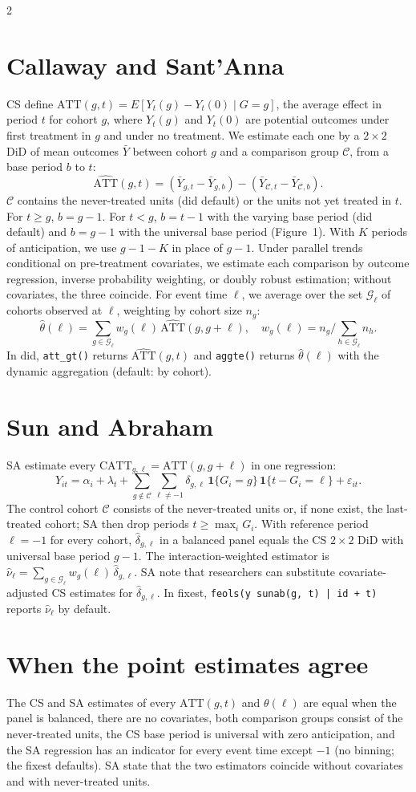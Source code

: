 \documentclass[10pt,letterpaper]{article}
\newcommand{\code}[1]{\texttt{#1}}
\newcommand{\ind}{\mathbf{1}}
\newcommand{\Cg}{\mathcal{C}}
\newcommand{\Gl}{\mathcal{G}_\ell}
\newcommand{\ATT}{\mathrm{ATT}}
\newcommand{\hATT}{\widehat{\mathrm{ATT}}}
\begin{document}
\begin{multicols}{2}
\section{Callaway and Sant'Anna}
CS define $\ATT(g,t)=E[Y_t(g)-Y_t(0)\mid G=g]$, the average effect in period $t$ for cohort $g$, where $Y_t(g)$ and $Y_t(0)$ are potential outcomes under first treatment in $g$ and under no treatment. We estimate each one by a $2{\times}2$ DiD of mean outcomes $\bar Y$ between cohort $g$ and a comparison group $\Cg$, from a base period $b$ to $t$:
\[
\hATT(g,t)=(\bar Y_{g,t}-\bar Y_{g,b})-(\bar Y_{\Cg,t}-\bar Y_{\Cg,b}).
\]
$\Cg$ contains the never-treated units (did default) or the units not yet treated in $t$. For $t\ge g$, $b=g-1$. For $t<g$, $b=t-1$ with the varying base period (did default) and $b=g-1$ with the universal base period (Figure~1). With $K$ periods of anticipation, we use $g-1-K$ in place of $g-1$. Under parallel trends conditional on pre-treatment covariates, we estimate each comparison by outcome regression, inverse probability weighting, or doubly robust estimation; without covariates, the three coincide. For event time $\ell$, we average over the set $\Gl$ of cohorts observed at $\ell$, weighting by cohort size $n_g$:
\[
\hat\theta(\ell)=\textstyle\sum_{g\in\Gl}w_g(\ell)\,\hATT(g,g+\ell),\quad w_g(\ell)=n_g\big/\textstyle\sum_{h\in\Gl}n_h.
\]
In did, \code{att\_gt()} returns $\hATT(g,t)$ and \code{aggte()} returns $\hat\theta(\ell)$ with the dynamic aggregation (default: by cohort).

\section{Sun and Abraham}
SA estimate every $\mathrm{CATT}_{g,\ell}=\ATT(g,g+\ell)$ in one regression:
\[
Y_{it}=\alpha_i+\lambda_t+\textstyle\sum_{g\notin\Cg}\sum_{\ell\neq-1}\delta_{g,\ell}\,\ind\{G_i=g\}\,\ind\{t-G_i=\ell\}+\varepsilon_{it}.
\]
The control cohort $\Cg$ consists of the never-treated units or, if none exist, the last-treated cohort; SA then drop periods $t\ge\max_i G_i$. With reference period $\ell=-1$ for every cohort, $\hat\delta_{g,\ell}$ in a balanced panel equals the CS $2{\times}2$ DiD with universal base period $g-1$. The interaction-weighted estimator is $\hat\nu_\ell=\sum_{g\in\Gl}w_g(\ell)\,\hat\delta_{g,\ell}$. SA note that researchers can substitute covariate-adjusted CS estimates for $\hat\delta_{g,\ell}$. In fixest, \code{feols(y \raisebox{0.45ex}{\texttildelow} sunab(g, t) | id + t)} reports $\hat\nu_\ell$ by default.

\section{When the point estimates agree}
The CS and SA estimates of every $\ATT(g,t)$ and $\theta(\ell)$ are equal when the panel is balanced, there are no covariates, both comparison groups consist of the never-treated units, the CS base period is universal with zero anticipation, and the SA regression has an indicator for every event time except $-1$ (no binning; the fixest defaults). SA state that the two estimators coincide without covariates and with never-treated units.
\end{multicols}
\end{document}
